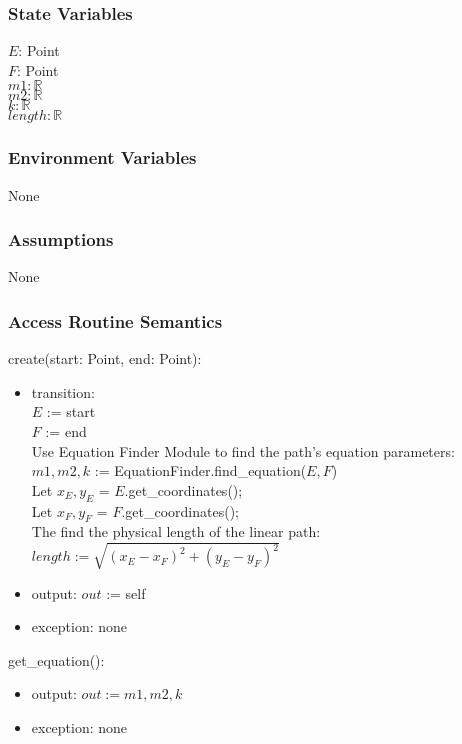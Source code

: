 \documentclass[12pt, titlepage]{article}
\begin{document}
\subsubsection{State Variables}
$E$: Point\\
$F$: Point\\
$m1: \mathbb{R}$\\
$m2: \mathbb{R}$\\
$k: \mathbb{R}$\\
$length: \mathbb{R}$

\subsubsection{Environment Variables} None

\subsubsection{Assumptions} None

\subsubsection{Access Routine Semantics}

\noindent create(start: Point, end: Point):
\begin{itemize}
\item transition: \\
$E$ := start\\
$F$ := end\\

Use Equation Finder Module to find the path's equation parameters:\\
$m1, m2, k$ :=  EquationFinder.find\_equation($E, F$)\\


Let $x_E, y_E$ = $E$.get\_coordinates();\\
Let $x_F, y_F$ = $F$.get\_coordinates();\\
The find the physical length of the linear path:\\
$length := \sqrt{(x_E - x_F)^2 + (y_E - y_F)^2}$
\item output: $out$ := self 
\item exception: none
\end{itemize}

\noindent get\_equation():
\begin{itemize}
\item output: $out :=  m1, m2, k$
\item exception: none
\end{itemize}
\end{document}
